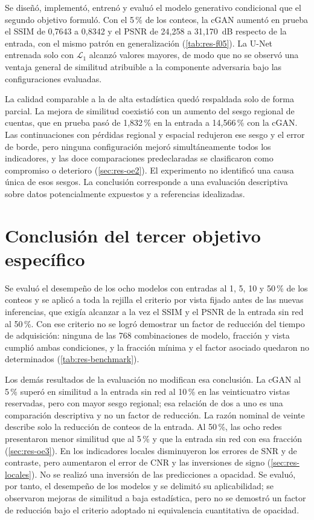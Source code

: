 Se diseñó, implementó, entrenó y evaluó el modelo generativo condicional que el segundo objetivo formuló. Con el 5\,\% de los conteos, la cGAN aumentó en prueba el SSIM de 0,7643 a 0,8342 y el PSNR de 24,258 a 31,170~dB respecto de la entrada, con el mismo patrón en generalización (\cref{tab:res-f05}). La U-Net entrenada solo con $\mathcal L_1$ alcanzó valores mayores, de modo que no se observó una ventaja general de similitud atribuible a la componente adversaria bajo las configuraciones evaluadas.

La calidad comparable a la de alta estadística quedó respaldada solo de forma parcial. La mejora de similitud coexistió con un aumento del sesgo regional de cuentas, que en prueba pasó de 1,832\,\% en la entrada a 14,566\,\% con la cGAN. Las continuaciones con pérdidas regional y espacial redujeron ese sesgo y el error de borde, pero ninguna configuración mejoró simultáneamente todos los indicadores, y las doce comparaciones predeclaradas se clasificaron como compromiso o deterioro (\cref{sec:res-oe2}). El experimento no identificó una causa única de esos sesgos. La conclusión corresponde a una evaluación descriptiva sobre datos potencialmente expuestos y a referencias idealizadas.

\section{Conclusión del tercer objetivo específico}
\label{sec:conc-oe3}

Se evaluó el desempeño de los ocho modelos con entradas al 1, 5, 10 y 50\,\% de los conteos y se aplicó a toda la rejilla el criterio por vista fijado antes de las nuevas inferencias, que exigía alcanzar a la vez el SSIM y el PSNR de la entrada sin red al 50\,\%. Con ese criterio no se logró demostrar un factor de reducción del tiempo de adquisición: ninguna de las 768 combinaciones de modelo, fracción y vista cumplió ambas condiciones, y la fracción mínima y el factor asociado quedaron no determinados (\cref{tab:res-benchmark}).

Los demás resultados de la evaluación no modifican esa conclusión. La cGAN al 5\,\% superó en similitud a la entrada sin red al 10\,\% en las veinticuatro vistas reservadas, pero con mayor sesgo regional; esa relación de dos a uno es una comparación descriptiva y no un factor de reducción. La razón nominal de veinte describe solo la reducción de conteos de la entrada. Al 50\,\%, las ocho redes presentaron menor similitud que al 5\,\% y que la entrada sin red con esa fracción (\cref{sec:res-oe3}). En los indicadores locales disminuyeron los errores de SNR y de contraste, pero aumentaron el error de CNR y las inversiones de signo (\cref{sec:res-locales}). No se realizó una inversión de las predicciones a opacidad. Se evaluó, por tanto, el desempeño de los modelos y se delimitó su aplicabilidad; se observaron mejoras de similitud a baja estadística, pero no se demostró un factor de reducción bajo el criterio adoptado ni equivalencia cuantitativa de opacidad.


